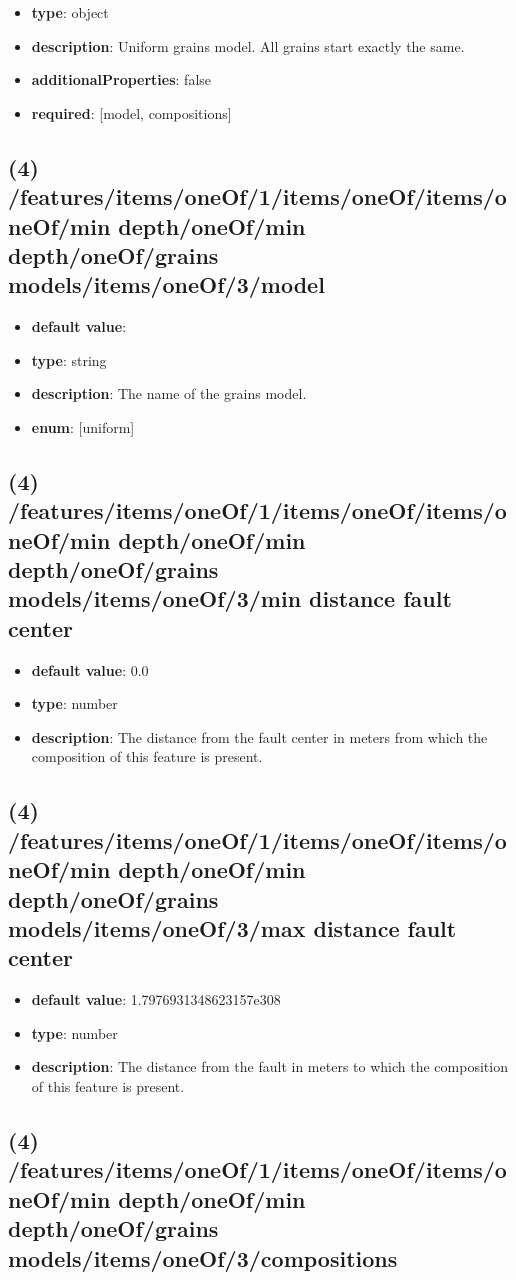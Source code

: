 \begin{itemize}[leftmargin=3em]\item {\bf type}: object
\item {\bf description}: Uniform grains model. All grains start exactly the same.
\item {\bf additionalProperties}: false
\item {\bf required}: [model, compositions]\end{itemize}
\subsection{(4) /features/items/oneOf/1/items/oneOf/items/oneOf/min depth/oneOf/min depth/oneOf/grains models/items/oneOf/3/model}
\begin{itemize}[leftmargin=4em]\item {\bf default value}: 
\item {\bf type}: string
\item {\bf description}: The name of the grains model.
\item {\bf enum}: [uniform]\end{itemize}\subsection{(4) /features/items/oneOf/1/items/oneOf/items/oneOf/min depth/oneOf/min depth/oneOf/grains models/items/oneOf/3/min distance fault center}
\begin{itemize}[leftmargin=4em]\item {\bf default value}: 0.0
\item {\bf type}: number
\item {\bf description}: The distance from the fault center in meters from which the composition of this feature is present.
\end{itemize}\subsection{(4) /features/items/oneOf/1/items/oneOf/items/oneOf/min depth/oneOf/min depth/oneOf/grains models/items/oneOf/3/max distance fault center}
\begin{itemize}[leftmargin=4em]\item {\bf default value}: 1.7976931348623157e308
\item {\bf type}: number
\item {\bf description}: The distance from the fault in meters to which the composition of this feature is present.
\end{itemize}\subsection{(4) /features/items/oneOf/1/items/oneOf/items/oneOf/min depth/oneOf/min depth/oneOf/grains models/items/oneOf/3/compositions}
